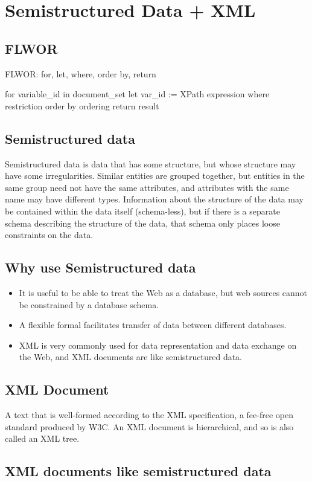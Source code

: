 \documentclass[10pt]{article}
\begin{document}
  \section*{Semistructured Data + XML}
    \subsection*{FLWOR}
    FLWOR: for, let, where, order by, return

    for variable\_id in document\_set 
    let var\_id := XPath expression 
    where restriction
    order by ordering
    return result
    \subsection*{Semistructured data}
        Semistructured data is data that has some structure, but whose structure may have some irregularities. Similar entities are grouped together, but entities in the same group need not have the same attributes, and attributes with the same name may have different types.
        Information about the structure of the data may be contained within the data itself (schema-less), but if there is a separate schema describing the structure of the data, that schema only places loose constraints on the data.
        \subsection*{Why use Semistructured data}
          \begin{itemize}
            \item It is useful to be able to treat the Web as a database, but web sources cannot be constrained by a database schema.
            \item A flexible formal facilitates transfer of data between different databases.
            \item XML is very commonly used for data representation and data exchange on the Web, and XML documents are like semistructured data.
          \end{itemize}
        
        \subsection*{XML Document}
          A text that is well-formed according to the XML specification, a fee-free open standard produced by W3C. An XML document is hierarchical, and so is also called an XML tree.
        \subsection*{XML documents like semistructured data}
\end{document}
